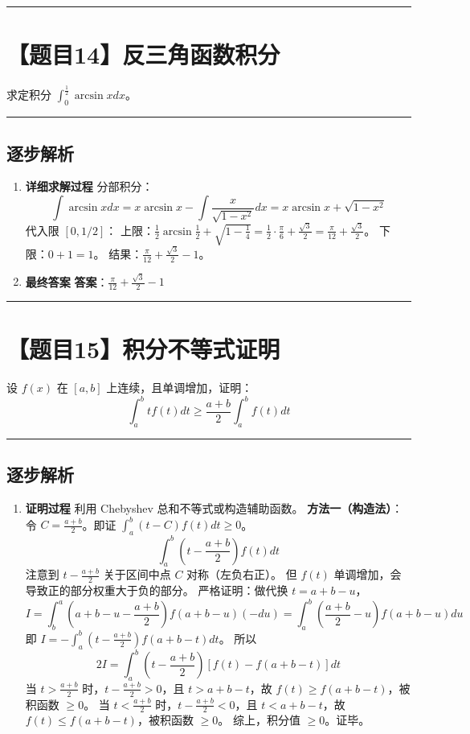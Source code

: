 \documentclass[UTF8]{ctexart}
\newenvironment{redenv}{\color{red}}{}
\newenvironment{detailedanalysis}{%
    \color{red}
    \begin{enumerate}[label=\textbf{第\arabic*步：}, leftmargin=*, align=left, itemsep=1.5ex]
}{%
    \end{enumerate}
}
\newcommand{\problemrule}{\noindent\rule{\textwidth}{1.5pt}\vspace{-0.8em}}
\newcommand{\analysisrule}{\noindent\rule{\textwidth}{0.8pt}\vspace{-0.8em}}
\begin{document}
\problemrule
\section*{【题目14】反三角函数积分}
求定积分 $ \int_{0}^{\frac{1}{2}}\arcsin x dx $。

\begin{redenv}
\analysisrule
\subsection*{逐步解析}

\begin{detailedanalysis}
\item \textbf{详细求解过程}
分部积分：
$$ \int \arcsin x dx = x\arcsin x - \int \frac{x}{\sqrt{1-x^2}} dx = x\arcsin x + \sqrt{1-x^2} $$
代入限 $[0, 1/2]$：
上限：$\frac{1}{2} \arcsin \frac{1}{2} + \sqrt{1 - \frac{1}{4}} = \frac{1}{2} \cdot \frac{\pi}{6} + \frac{\sqrt{3}}{2} = \frac{\pi}{12} + \frac{\sqrt{3}}{2}$。
下限：$0 + 1 = 1$。
结果：$\frac{\pi}{12} + \frac{\sqrt{3}}{2} - 1$。

\item \textbf{最终答案}
\textbf{答案}：$ \frac{\pi}{12} + \frac{\sqrt{3}}{2} - 1 $
\end{detailedanalysis}
\end{redenv}

\problemrule
\section*{【题目15】积分不等式证明}
设 $ f(x) $ 在 $ [a,b] $ 上连续，且单调增加，证明：
$$ \int_{a}^{b}tf(t)dt\geq\frac{a+b}{2}\int_{a}^{b}f(t)dt $$

\begin{redenv}
\analysisrule
\subsection*{逐步解析}

\begin{detailedanalysis}
\item \textbf{证明过程}
利用 Chebyshev 总和不等式或构造辅助函数。
\textbf{方法一（构造法）}：
令 $C = \frac{a+b}{2}$。即证 $\int_a^b (t - C) f(t) dt \ge 0$。
$$ \int_a^b (t - \frac{a+b}{2}) f(t) dt $$
注意到 $t - \frac{a+b}{2}$ 关于区间中点 $C$ 对称（左负右正）。
但 $f(t)$ 单调增加，会导致正的部分权重大于负的部分。
严格证明：做代换 $t = a+b-u$，
$$ I = \int_b^a (a+b-u - \frac{a+b}{2}) f(a+b-u) (-du) = \int_a^b (\frac{a+b}{2} - u) f(a+b-u) du $$
即 $I = - \int_a^b (t - \frac{a+b}{2}) f(a+b-t) dt$。
所以
$$ 2I = \int_a^b (t - \frac{a+b}{2}) [f(t) - f(a+b-t)] dt $$
当 $t > \frac{a+b}{2}$ 时，$t - \frac{a+b}{2} > 0$，且 $t > a+b-t$，故 $f(t) \ge f(a+b-t)$，被积函数 $\ge 0$。
当 $t < \frac{a+b}{2}$ 时，$t - \frac{a+b}{2} < 0$，且 $t < a+b-t$，故 $f(t) \le f(a+b-t)$，被积函数 $\ge 0$。
综上，积分值 $\ge 0$。证毕。
\end{detailedanalysis}
\end{redenv}
\end{document}
